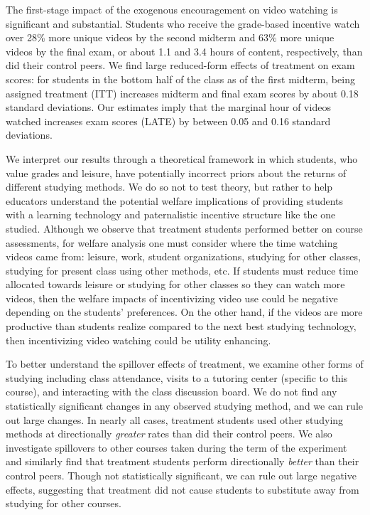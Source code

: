\documentclass[12pt]{article}
\begin{document}
The first-stage impact of the exogenous encouragement on video watching is significant and substantial. Students who receive the grade-based incentive watch over 28\% more unique videos by the second midterm and 63\% more unique videos by the final exam, or about 1.1 and 3.4 hours of content, respectively, than did their control peers. We find large reduced-form effects of treatment on exam scores: for students in the bottom half of the class as of the first midterm, being assigned treatment (ITT) increases midterm and final exam scores by about 0.18 standard deviations. Our estimates imply that the marginal hour of videos watched increases exam scores (LATE) by between 0.05 and 0.16 standard deviations.

We interpret our results through a theoretical framework in which students, who value grades and leisure, have potentially incorrect priors about the returns of different studying methods. We do so not to test theory, but rather to help educators understand the potential welfare implications of providing students with a learning technology and paternalistic incentive structure like the one studied. Although we observe that treatment students performed better on course assessments, for welfare analysis one must consider where the time watching videos came from: leisure, work, student organizations, studying for other classes, studying for present class using other methods, etc. If students must reduce time allocated towards leisure or studying for other classes so they can watch more videos, then the welfare impacts of incentivizing video use could be negative depending on the students' preferences. On the other hand, if the videos are more productive than students realize compared to the next best studying technology, then incentivizing video watching could be utility enhancing.

To better understand the spillover effects of treatment, we examine other forms of studying including class attendance, visits to a tutoring center (specific to this course), and interacting with the class discussion board. We do not find any statistically significant changes in any observed studying method, and we can rule out large changes. In nearly all cases, treatment students used other studying methods at directionally \textit{greater} rates than did their control peers. We also investigate spillovers to other courses taken during the term of the experiment and similarly find that treatment students perform directionally \textit{better} than their control peers. Though not statistically significant, we can rule out large negative effects, suggesting that treatment did not cause students to substitute away from studying for other courses.
\end{document}

